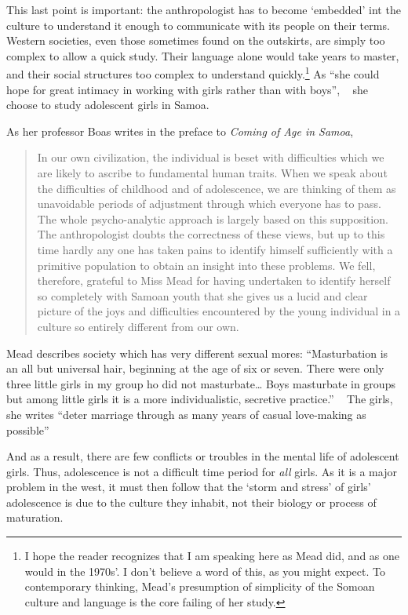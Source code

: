 \begin{refsection}
This last point is important: the anthropologist has to become `embedded' int the culture to understand it enough to communicate with its people on their terms. Western societies, even those sometimes found on the outskirts, are simply too complex to allow a quick study. Their language alone would take years to master, and their social structures too complex to understand quickly.\footnote{I hope the reader recognizes that I am speaking here as Mead did, and as one would in the 1970s'. I don't believe a word of this, as you might expect. To contemporary thinking, Mead's presumption of simplicity of the Somoan culture and language is the core failing of her study.} As ``she could hope for great intimacy in working with girls rather than with boys'', ~\citep[p. 9]{Mead:1928uk} she choose to study adolescent girls in Samoa.

As her professor Boas writes in the preface to \emph{Coming of Age in Samoa}, 

\begin{quote}

In our own civilization, the individual is beset with difficulties which we are likely to ascribe to fundamental human traits. When we speak about the difficulties of childhood and of adolescence, we are thinking of them as unavoidable periods of adjustment through which everyone has to pass. The whole psycho-analytic approach is largely based on this supposition.
The anthropologist doubts the correctness of these views, but up to this time hardly any one has taken pains to identify himself sufficiently with a primitive population to obtain an insight into these problems. We fell, therefore, grateful to Miss Mead for having undertaken to identify herself so completely with Samoan youth that she gives us a lucid and clear picture of the joys and difficulties encountered by the young individual in a culture so entirely different from our own. ~\citep{Mead:1928uk}
\end{quote}

Mead describes society which has very different sexual mores: ``Masturbation is an all but universal hair, beginning at the age of six or seven. There were only three little girls in my group ho did not masturbate{\ldots} Boys masturbate in groups but among little girls it is a more individualistic, secretive practice.'' ~\citep[p. 136]{Mead:1928uk} The girls, she writes ``deter marriage through as many years of casual love-making as possible'' ~\citep[p. 195]{Mead:1928uk}

And as a result, there are few conflicts or troubles in the mental life of adolescent girls. Thus, adolescence is not a difficult time period for \emph{all} girls. As it is a major problem in the west, it must then follow that the `storm and stress' of girls' adolescence is due to the culture they inhabit, not their biology or process of maturation.


\end{refsection}
